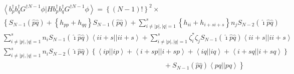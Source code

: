 \begin{eqnarray}
&&\left\langle b_{p}^{\dagger }b_{q}^{\dagger }G^{\dagger N-1}\phi
|Hb_{p}^{\dagger }b_{q}^{\dagger }G^{\dagger N-1}\phi \right\rangle =\left\{
\left( N-1\right) !\right\} ^{2}\times  \nonumber \\
&&\left\{ S_{N-1}\left( \hat{p}\hat{q}\right) +\right. \left\{
h_{pp}+h_{qq}\right\} S_{N-1}\left( \hat{p}\hat{q}\right) +\sum_{i\neq
\left| p\right| ,\left| q\right| =1}^{s}\left\{ h_{ii}+h_{i+si+s}\right\}
n_{j}S_{N-2}\left( \hat{\imath}\hat{p}\hat{q}\right)  \nonumber \\
&&\sum_{i\neq \left| p\right| ,\left| q\right| =1}^{s}n_{i}S_{N-1}\left( 
\hat{\imath}\hat{p}\hat{q}\right) \left\langle ii+s||ii+s\right\rangle
+\sum_{i\neq \left| p\right| ,\left| q\right| =1}^{s}\zeta _{i}^{\ast }\zeta
_{j}S_{N-1}\left( \hat{\imath}\hat{p}\hat{q}\right) \left\langle
ii+s||ii+s\right\rangle  \nonumber \\
&&\sum_{i\neq \left| p\right| ,\left| q\right| =1}^{s}n_{i}S_{N-2}\left( 
\hat{\imath}\hat{p}\hat{q}\right) \left\{ \left\langle ip||ip\right\rangle
+\left\langle i+sp||i+sp\right\rangle +\left\langle iq||iq\right\rangle
+\left\langle i+sq||i+sq\right\rangle \right\}  \nonumber \\
&&\qquad \qquad \qquad \qquad \qquad \qquad \qquad \qquad \qquad \qquad
\qquad \quad +\left. S_{N-1}(\hat{p}\hat{q})\left\langle pq||pq\right\rangle
\right\}
\end{eqnarray}

